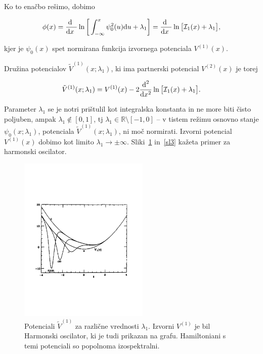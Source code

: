 \ni Ko to ena\v cbo re\v simo, dobimo

\begin{equation}
	\phi(x) = \frac{\text{d}^{}\ }{\text{d} x^{}\ } \ln \bigg[\int_{-\infty}^x \psi_0^2(u)\text{d} u + \lambda_1\bigg] =
		\frac{\text{d}^{}\ }{\text{d} x^{}\ } \ln \big[\mathcal{I}_1(x) + \lambda_1\big],
\end{equation}

\ni kjer je $\psi_0(x)$ spet normirana funkcija izvornega potenciala $V^{(1)} (x)$.

Dru\v zina potencialov $\tilde{V}^{(1)} (x; \lambda_1)$, ki ima partnerski potencial $V^{(2)}(x)$ je torej

\begin{equation}
	\tilde{V}^{(1)} (x;\lambda_1) = V^{(1)}(x) - 2\frac{\text{d}^2}{\text{d} x^2}\ln\big[\mathcal{I}_1(x) + \lambda_1\big].
\end{equation}

\ni Parameter $\lambda_1$ se je notri pri\v stulil kot integralska konstanta in ne more biti \v cisto poljuben, ampak
$\lambda_1 \notin [0,1]$, tj $\lambda_1 \in \mathbb{R}\text{\textbackslash}[-1,0]$ -- v tistem re\v zimu osnovno stanje
$\psi_0 (x; \lambda_1)$, potenciala $\tilde{V}^{(1)}(x; \lambda_1)$, ni mo\v c normirati. Izvorni potencial $V^{(1)}(x)$
dobimo kot limito $\lambda_1 \to \pm \infty$. Sliki~\ref{sl2} in~\ref{sl3} ka\v zeta primer za harmonski oscilator.

\begin{figure}[H]
	\centering
	\includegraphics[height=8cm, keepaspectratio=1, trim=0cm 7cm 0cm 7cm]{pics/slika2}
	\caption{Potenciali $\tilde{V}^{(1)}$ za razli\v cne vrednosti $\lambda_1$. Izvorni $V^{(1)}$ je bil Harmonski
		oscilator, ki je tudi prikazan na grafu. Hamiltoniani s temi potenciali so popolnoma izospektralni.}
	\label{sl2}
\end{figure}

